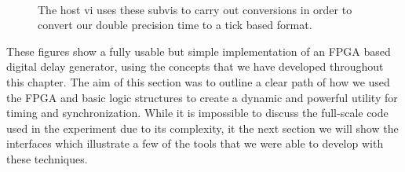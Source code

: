 \begin{figure}[!ht]
  \centering
   \\
  \caption[DDG Subvis]{The host vi uses these subvis to carry out conversions in order to convert our double precision time to a tick based format.}
  \label{fig:ddg_subvi}
\end{figure}

These figures show a fully usable but simple implementation of an FPGA based  digital delay generator, using the concepts that we have developed throughout this chapter.  The aim of this section was to outline a clear path of how we used the FPGA and basic logic structures to create a dynamic and powerful utility for timing and synchronization.  While it is impossible to discuss the full-scale code used in the experiment due to its complexity, it the next section we will show the interfaces which illustrate a few of the tools that we were able to develop with these techniques.


